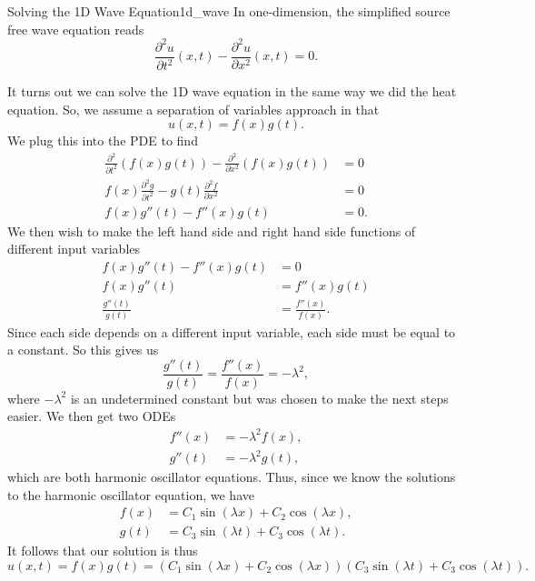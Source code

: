        \begin{ex}{Solving the 1D Wave Equation}{1d_wave}
        In one-dimension, the simplified source free wave equation reads
        \[
        \frac{\partial^2 u}{\partial t^2}(x,t) -\frac{\partial^2 u}{\partial x^2}(x,t)=0.
        \]
        
        It turns out we can solve the 1D wave equation in the same way we did the heat equation. So, we assume a separation of variables approach in that 
        \[
        u(x,t) = f(x)g(t).
        \]
        We plug this into the PDE to find
        \begin{align*}
            \frac{\partial^2}{\partial t^2}(f(x)g(t))-\frac{\partial^2}{\partial x^2}(f(x)g(t))&=0\\
            f(x)\frac{\partial^2 g}{\partial t^2}-g(t)\frac{\partial^2 f}{\partial x^2}&=0\\
            f(x)g''(t)-f''(x)g(t)&=0.
        \end{align*}
        We then wish to make the left hand side and right hand side functions of different input variables
        \begin{align*}
            f(x)g''(t)-f''(x)g(t)&=0\\
            f(x)g''(t)&=f''(x)g(t)\\
            \frac{g''(t)}{g(t)}&= \frac{f''(x)}{f(x)}.
        \end{align*}
        Since each side depends on a different input variable, each side must be equal to a constant.  So this gives us
        \[
        \frac{g''(t)}{g(t)}= \frac{f''(x)}{f(x)}= -\lambda^2,
        \]
        where $-\lambda^2$ is an undetermined constant but was chosen to make the next steps easier. We then get two ODEs
        \begin{align*}
            f''(x)&=-\lambda^2 f(x),\\
            g''(t)&=-\lambda^2 g(t),
        \end{align*}
        which are both harmonic oscillator equations.  Thus, since we know the solutions to the harmonic oscillator equation, we have
        \begin{align*}
            f(x)&=C_1 \sin(\lambda x)+ C_2 \cos(\lambda x),\\
            g(t)&=C_3 \sin(\lambda t)+ C_3 \cos(\lambda t).
        \end{align*}
        It follows that our solution is thus
        \[
        \boxed{u(x,t)=f(x)g(t)= (C_1 \sin(\lambda x)+ C_2 \cos(\lambda x))(C_3 \sin(\lambda t)+ C_3 \cos(\lambda t)).}
        \]
        \end{ex}
        
